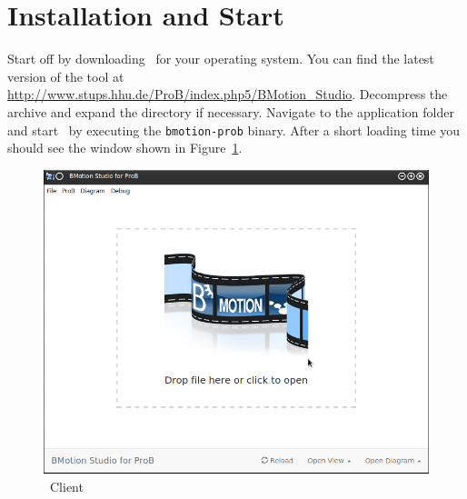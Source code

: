 \section{Installation and Start}
\label{installation}

Start off by downloading \bms~for your operating system. 
You can find the latest version of the tool at \url{http://www.stups.hhu.de/ProB/index.php5/BMotion_Studio}.
Decompress the archive and expand the directory if necessary. 
%
%
Navigate to the application folder and start \bms~by executing the \texttt{bmotion-prob} binary.
After a short loading time you should see the window shown in Figure~\ref{fig_bms_client}.

\begin{figure}[!ht]
\begin{center}
	\includegraphics[width=.8\textwidth]{img/tutorial/clientstartscreen.png}
	\caption{\bms\ Client}
	\label{fig_bms_client}
\end{center}
\end{figure} 


